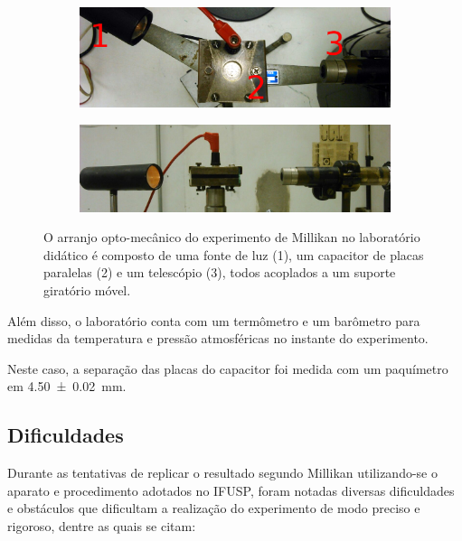 \documentclass[twoside, twocolumn]{article}
\begin{document}
\begin{figure}[h]
	\centering
    \begin{subfigure}[b]{0.8\linewidth}
    	\includegraphics[width = \linewidth]{3.jpeg}
    \end{subfigure}
        \begin{subfigure}[b]{0.8\linewidth}
    	\includegraphics[width = \linewidth]{4.jpeg}
    \end{subfigure}
    \caption{O arranjo opto-mecânico do experimento de Millikan no laboratório didático é composto de uma fonte de luz (1), um capacitor de placas paralelas (2) e um telescópio (3), todos acoplados a um suporte giratório móvel.}
    \label{fig:arranjo}
\end{figure}

Além disso, o laboratório conta com um termômetro e um barômetro para medidas da temperatura e pressão atmosféricas no instante do experimento.

Neste caso, a separação das placas do capacitor foi medida com um paquímetro em \SI{4.50(2)}{\milli\meter}.


\subsection{Dificuldades}

Durante as tentativas de replicar o resultado segundo Millikan utilizando-se o aparato e procedimento adotados no IFUSP, foram notadas diversas dificuldades e obstáculos que dificultam a realização do experimento de modo preciso e rigoroso, dentre as quais se citam:
\end{document}
